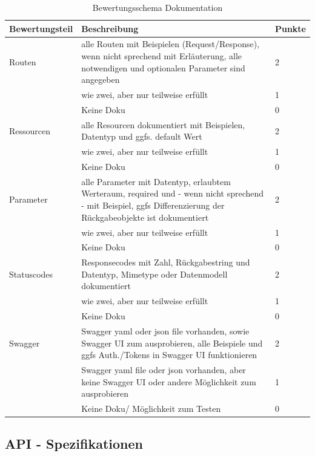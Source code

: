 \documentclass[notitlepage, hidelinks]{article}
\begin{document}
\begin{table}[H]
\begin{center}
\begin{tabular}{|p{3.6cm}|p{8.5cm}|p{2.5cm}|}
\hline
\textbf{Bewertungsteil} & \textbf{Beschreibung} & \textbf{Punkte}\\ \hline
Routen & alle Routen mit Beispielen (Request/Response), wenn nicht sprechend mit Erläuterung, alle notwendigen und optionalen Parameter sind angegeben & 2 \\ \hline
& wie zwei, aber nur teilweise erfüllt & 1 \\ \hline
& Keine Doku & 0 \\ \hline
Ressourcen & alle Resourcen dokumentiert mit Beispielen, Datentyp und ggfs. default Wert & 2 \\ \hline
& wie zwei, aber nur teilweise erfüllt & 1 \\ \hline
& Keine Doku & 0 \\ \hline
Parameter & alle Parameter mit Datentyp, erlaubtem Werteraum, required und - wenn nicht sprechend - mit Beispiel, ggfs Differenzierung der Rückgabeobjekte ist dokumentiert & 2 \\ \hline
& wie zwei, aber nur teilweise erfüllt & 1 \\ \hline
& Keine Doku & 0 \\ \hline
Statuscodes & Responsecodes mit Zahl, Rückgabestring und Datentyp, Mimetype oder Datenmodell dokumentiert & 2 \\ \hline
& wie zwei, aber nur teilweise erfüllt & 1 \\ \hline
& Keine Doku & 0 \\ \hline
Swagger & Swagger yaml oder json file vorhanden, sowie Swagger UI zum ausprobieren, alle Beispiele und ggfs Auth./Tokens in Swagger UI funktionieren & 2 \\ \hline
& Swagger yaml file oder json vorhanden, aber keine Swagger UI oder andere Möglichkeit zum ausprobieren & 1 \\ \hline
& Keine Doku/ Möglichkeit zum Testen & 0 \\ \hline
\end{tabular}
\caption{Bewertungsschema Dokumentation}
\label{documentation}
\end{center}
\end{table}

\subsection{API - Spezifikationen}
\end{document}
